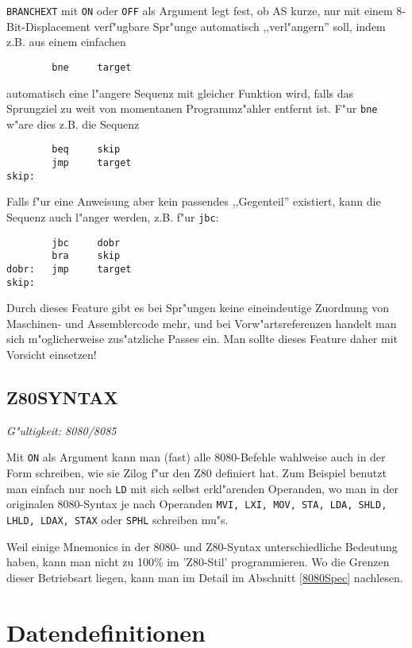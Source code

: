 \documentclass[12pt,a4paper,twoside]{report}
\makeatletter
\newcommand{\tty}[1]{{\tt #1}}
\newcommand{\ttindex}[1]{\index{#1@{\tt #1}}}
\makeatother
\begin{document}
{\tt BRANCHEXT} mit \tty{ON} oder \tty{OFF} als Argument legt fest, ob AS
kurze, nur mit einem 8-Bit-Displacement verf"ugbare Spr"unge automatisch
,,verl"angern'' soll, indem z.B. aus einem einfachen
\begin{verbatim}
        bne     target
\end{verbatim}
automatisch eine l"angere Sequenz mit gleicher Funktion wird, falls das
Sprungziel zu weit von momentanen Programmz"ahler entfernt ist.  F"ur
{\tt bne} w"are dies z.B. die Sequenz
\begin{verbatim}
        beq     skip
        jmp     target
skip:
\end{verbatim}
Falls f"ur eine Anweisung aber kein passendes ,,Gegenteil'' existiert,
kann die Sequenz auch l"anger werden, z.B. f"ur {\tt jbc}:
\begin{verbatim}
        jbc     dobr
        bra     skip
dobr:   jmp     target
skip:
\end{verbatim}
Durch dieses Feature gibt es bei Spr"ungen keine eineindeutige Zuordnung
von Maschinen- und Assemblercode mehr, und bei Vorw"artsreferenzen handelt
man sich m"oglicherweise zus"atzliche Passes ein.  Man sollte dieses
Feature daher mit Vorsicht einsetzen!


\subsection{Z80SYNTAX}
\ttindex{Z80SYNTAX}

{\em G"ultigkeit: 8080/8085}

Mit \tty{ON} als Argument kann man (fast) alle 8080-Befehle wahlweise
auch in der Form schreiben, wie sie Zilog f"ur den Z80 definiert hat.
Zum Beispiel benutzt man einfach nur noch \tty{LD} mit sich selbst
erkl"arenden Operanden, wo man in der originalen 8080-Syntax je nach
Operanden \tty{MVI, LXI, MOV, STA, LDA, SHLD, LHLD, LDAX, STAX} oder
\tty{SPHL} schreiben mu"s.

Weil einige Mnemonics in der 8080- und Z80-Syntax unterschiedliche
Bedeutung haben, kann man nicht zu 100\% im 'Z80-Stil' programmieren.
Wo die Grenzen dieser Betriebsart liegen, kann man im Detail im
Abschnitt \ref{8080Spec} nachlesen.


\section{Datendefinitionen}
\end{document}
